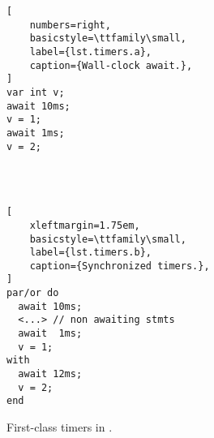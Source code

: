 \begin{figure}[h!]
\begin{minipage}[t]{0.37\linewidth}
\begin{lstlisting}[
    numbers=right,
    basicstyle=\ttfamily\small,
    label={lst.timers.a},
    caption={Wall-clock await.},
]
var int v;
await 10ms;
v = 1;
await 1ms;
v = 2;




\end{lstlisting}
\end{minipage}
%
\begin{minipage}[t]{0.59\linewidth}
\begin{lstlisting}[
    xleftmargin=1.75em,
    basicstyle=\ttfamily\small,
    label={lst.timers.b},
    caption={Synchronized timers.},
]
par/or do
  await 10ms;
  <...> // non awaiting stmts
  await  1ms;
  v = 1;
with
  await 12ms;
  v = 2;
end
\end{lstlisting}
\end{minipage}
\caption{First-class timers in \CEU.
\label{lst.timers}
}
\end{figure}


